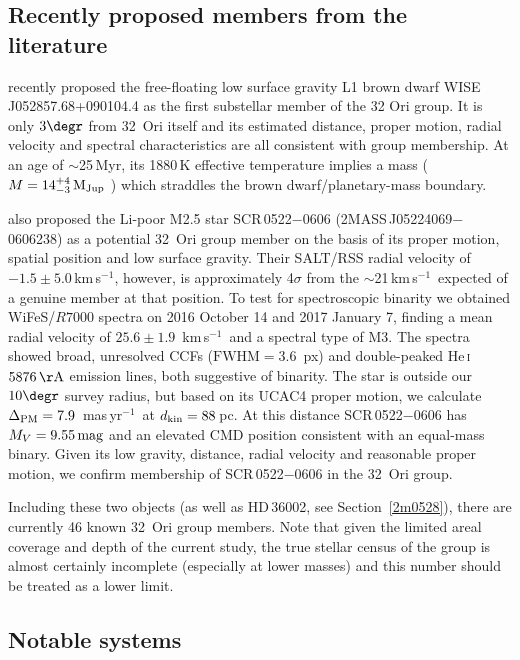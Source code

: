 \documentclass[usenatbib]{mnras}
\newcommand{\masyr}{mas\,yr$^{-1}$}
\newcommand{\kms}{\textrm{km\,s$^{-1}$}}
\begin{document}
\subsection{Recently proposed members from the literature}
\label{sec:burgasser}

\citet{Burgasser16} recently proposed the free-floating low surface
gravity L1 brown dwarf WISE\,J052857.68+090104.4 as the first
substellar member of the 32 Ori group. It is only $3\degr$ from 32~Ori
itself and its estimated distance, proper motion, radial velocity and
spectral characteristics are all consistent with group membership. At
an age of $\sim$25\,Myr, its 1880\,K effective temperature implies a
mass ($M = 14^{+4}_{-3}\,\rm{M_{Jup}}$ ) which straddles the brown
dwarf/planetary-mass boundary.

\citet{Riedel16} also proposed the Li-poor M2.5 star SCR\,0522$-$0606
(2MASS\,J05224069$-$0606238) as a potential 32~Ori group member on the
basis of its proper motion, spatial position and low surface
gravity. Their SALT/RSS radial velocity of $-1.5\pm5.0$\,\kms,
however, is approximately 4$\sigma$ from the $\sim$21\,\kms\ expected
of a genuine member at that position. To test for spectroscopic
binarity we obtained WiFeS/$R7000$ spectra on 2016 October 14 and 2017 January 7,
finding a mean radial velocity of $25.6\pm1.9$~\kms\ and a spectral type
of M3. The spectra showed broad, unresolved CCFs
($\textrm{FWHM}=3.6$~px) and double-peaked He\,\textsc{i}
$5876\,\rm{\AA}$ emission lines, both suggestive of binarity. The star
is outside our $10\degr$ survey radius, but based on its UCAC4 proper
motion, we calculate $\Delta_{\rm PM}=7.9$~\masyr\ at $d_{\rm
  kin}=88$\,pc. At this distance SCR\,0522$-$0606 has
$M_{V}=9.55\,\rm{mag}$ and an elevated CMD position consistent with an
equal-mass binary. Given its low gravity, distance, radial velocity
and reasonable proper motion, we confirm membership of
SCR\,0522$-$0606 in the 32~Ori group.

Including these two objects (as well as HD\,36002, see
Section~\ref{2m0528}), there are currently 46 known 32~Ori group
members. Note that given the limited areal coverage and depth of the
current study, the true stellar census of the group is almost
certainly incomplete (especially at lower masses) and this number should be treated as a lower
limit.

\subsection{Notable systems}
\end{document}
